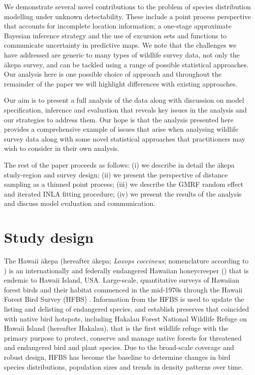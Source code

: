 \documentclass[preprint,12pt]{elsarticle}
\newcommand{\akepa}{\textquotesingle\={a}kepa}  %
\newcommand{\hawaii}{Hawai\textquotesingle i}   %
\begin{document}
We demonstrate several novel contributions to the problem of species distribution modelling under unknown detectability.  These include a point process perspective that accounts for incomplete location information; a one-stage approximate Bayesian inference strategy and the use of excursion sets and functions to communicate uncertainty in predictive maps.  We note that the challenges we have addressed are generic to many types of wildlife survey data, not only the \akepa{} survey, and can be tackled using a range of possible statistical approaches.  Our analysis here is one possible choice of approach and throughout the remainder of the paper we will highlight differences with existing approaches.

Our aim is to present a full analysis of the data along with discussion on model specification, inference and evaluation that reveals key issues in the analysis and our strategies to address them.  Our hope is that the analysis presented here provides a comprehensive example of issues that arise when analysing wildlife survey data along with some novel statistical approaches that practitioners may wish to consider in their own analysis.

The rest of the paper proceeds as follows:  (i) we describe in detail the \akepa{} study-region and survey design; (ii) we present the perspective of distance sampling as a thinned point process; (iii) we describe the GMRF random effect and iterated INLA fitting procedure; (iv) we present the results of the analysis and discuss model evaluation and communication.


\section{Study design}

The \hawaii{} \akepa{} (hereafter \akepa{}; \textit{Loxops coccineus}; nomenclature according to \citealp{usfws_akepa_1970}) is an internationally and federally endangered Hawaiian honeycreeper (\citealp{usfws_akepa_1970, birdlife_akepa_2016}) that is endemic to \hawaii{} Island, USA.  Large-scale, quantitative surveys of Hawaiian forest birds and their habitat commenced in the mid-1970s through the Hawaii Forest Bird Survey (HFBS) \citep{scott_HFBS_1986}. Information from the HFBS is used to update the listing and delisting of endangered species, and establish preserves that coincided with native bird hotspots, including Hakalau Forest National Wildlife Refuge on \hawaii{} Island (hereafter Hakalau), that is the first wildlife refuge with the primary purpose to protect, conserve and manage native forests for threatened and endangered bird and plant species. Due to the broad-scale coverage and robust design, HFBS has become the baseline to determine changes in bird species distributions, population sizes and trends in density patterns over time.
\end{document}
